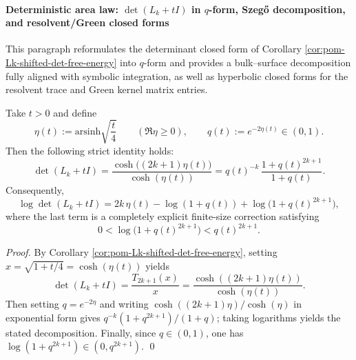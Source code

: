 \paragraph{Deterministic area law: \texorpdfstring{\(\det(L_k+tI)\)}{det(L_k+tI)} in \(q\)-form, Szeg\H{o} decomposition, and resolvent/Green closed forms}
This paragraph reformulates the determinant closed form of Corollary \ref{cor:pom-Lk-shifted-det-free-energy} into \(q\)-form and provides a bulk--surface decomposition fully aligned with symbolic integration,
as well as hyperbolic closed forms for the resolvent trace and Green kernel matrix entries.

\begin{corollary}\label{cor:pom-Lk-area-law-qform}
Take \(t>0\) and define
\[
\eta(t):=\mathrm{arsinh}\sqrt{\frac{t}{4}}\qquad(\Re\eta\ge 0),
\qquad
q(t):=e^{-2\eta(t)}\in(0,1).
\]
Then the following strict identity holds:
\[
\det(L_k+tI)=\frac{\cosh\!\bigl((2k+1)\eta(t)\bigr)}{\cosh(\eta(t))}
=q(t)^{-k}\,\frac{1+q(t)^{2k+1}}{1+q(t)}.
\]
Consequently,
\[
\log\det(L_k+tI)=2k\,\eta(t)-\log(1+q(t))+\log\bigl(1+q(t)^{2k+1}\bigr),
\]
where the last term is a completely explicit finite-size correction satisfying
\[
0<\log\bigl(1+q(t)^{2k+1}\bigr)<q(t)^{2k+1}.
\]
\end{corollary}
\begin{proof}
By Corollary \ref{cor:pom-Lk-shifted-det-free-energy}, setting \(x=\sqrt{1+t/4}=\cosh(\eta(t))\) yields
\[
\det(L_k+tI)=\frac{T_{2k+1}(x)}{x}=\frac{\cosh((2k+1)\eta(t))}{\cosh(\eta(t))}.
\]
Then setting \(q=e^{-2\eta}\) and writing \(\cosh((2k+1)\eta)/\cosh(\eta)\) in exponential form gives
\(
q^{-k}(1+q^{2k+1})/(1+q)
\);
taking logarithms yields the stated decomposition.
Finally, since \(q\in(0,1)\), one has \(\log(1+q^{2k+1})\in(0,q^{2k+1})\). \qed
\end{proof}

